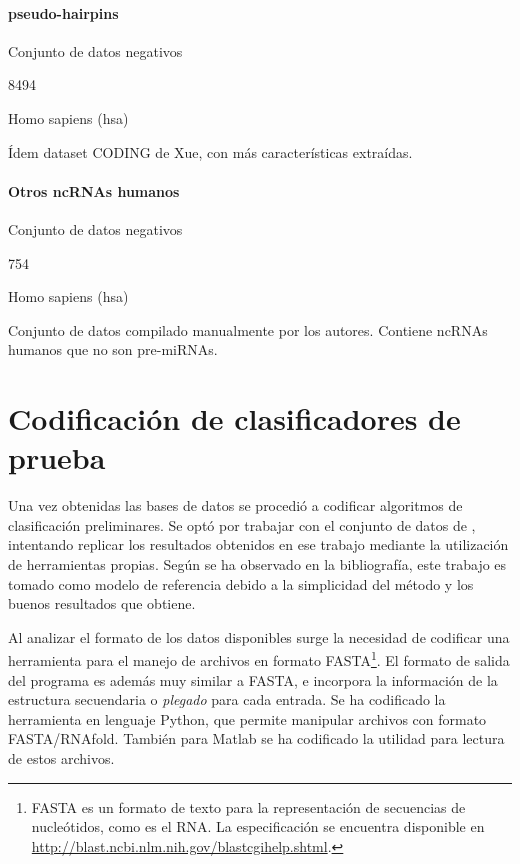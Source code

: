 \documentclass[12pt,bibliography=oldstyle,DIV=12,parskip=half-,titlepage]{scrartcl}
\begin{document}
\paragraph{pseudo-hairpins}
\begin{description}[style=nextline,leftmargin=3cm,align=right]
\item[Tipo:] Conjunto de datos negativos
\item[Núm. entradas:] 8494
\item[Especies:] Homo sapiens (hsa)
\item[Descripción:] Ídem dataset CODING de Xue, con más
  características extraídas.
\end{description}
%
\paragraph{Otros ncRNAs humanos}
\begin{description}[style=nextline,leftmargin=3cm,align=right]
\item[Tipo:] Conjunto de datos negativos
\item[Núm. entradas:] 754
\item[Especies:] Homo sapiens (hsa)
\item[Descripción:] Conjunto de datos compilado manualmente por los
  autores. Contiene ncRNAs humanos que no son pre-miRNAs.
\end{description}
%
%
%
%
\section{Codificación de clasificadores de prueba}
\label{pruebas}
%
Una vez obtenidas las bases de datos se procedió a codificar
algoritmos de clasificación preliminares.
Se optó por trabajar con el conjunto de datos de \cite{xue},
intentando replicar los resultados obtenidos en ese trabajo mediante
la utilización de herramientas propias. Según se ha observado en la
bibliografía, este trabajo es tomado como modelo de referencia debido a
la simplicidad del método y los buenos resultados que obtiene.

Al analizar el formato de los datos disponibles surge la necesidad
de codificar una herramienta para el manejo de archivos en formato
FASTA\footnote{FASTA es un formato de texto para la representación
  de secuencias de nucleótidos, como es el RNA.
  La especificación se encuentra disponible en
  \url{http://blast.ncbi.nlm.nih.gov/blastcgihelp.shtml}.}.
El formato de salida del programa  es además
muy similar a FASTA, e incorpora la información de la estructura
secuendaria o \emph{plegado} para cada entrada.
%
Se ha codificado la herramienta  en lenguaje Python,
que permite manipular archivos con formato FASTA/RNAfold. También para
Matlab se ha codificado la utilidad  para lectura
de estos archivos.
%
\end{document}
